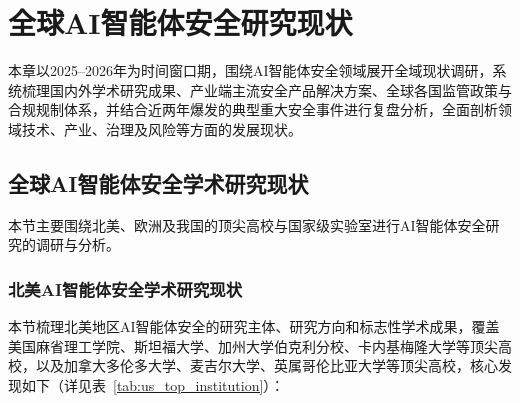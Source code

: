 \chapter{全球AI智能体安全研究现状}

本章以2025--2026年为时间窗口期，围绕AI智能体安全领域展开全域现状调研，系统梳理国内外学术研究成果、产业端主流安全产品解决方案、全球各国监管政策与合规规制体系，并结合近两年爆发的典型重大安全事件进行复盘分析，全面剖析领域技术、产业、治理及风险等方面的发展现状。


\section{全球AI智能体安全学术研究现状}
本节主要围绕北美、欧洲及我国的顶尖高校与国家级实验室进行AI智能体安全研究的调研与分析。

\subsection{北美AI智能体安全学术研究现状}
本节梳理北美地区AI智能体安全的研究主体、研究方向和标志性学术成果，覆盖美国麻省理工学院、斯坦福大学、加州大学伯克利分校、卡内基梅隆大学等顶尖高校，以及加拿大多伦多大学、麦吉尔大学、英属哥伦比亚大学等顶尖高校，核心发现如下（详见表~\ref{tab:us_top_institution}）：


